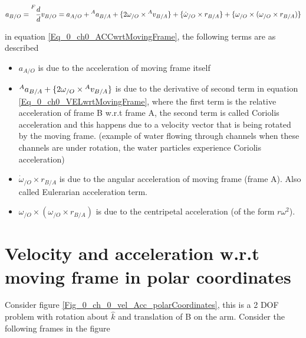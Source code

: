 \begin{equation} \label{Eq_0_ch0_ACCwrtMovingFrame}
	a_{B/O} = \prescript{F}{}{\frac{d}{d}v_{B/O}} = a_{A/O} + \prescript{A}{}{a_{B/A}} + \{ 2 \omega_{/O} \times \prescript{A}{}{v_{B/A}} \} + \{ \dot{\omega}_{/O} \times r_{B/A} \} + \{ \omega_{/O} \times (\omega_{/O} \times r_{B/A}) \}
\end{equation}

in equation \eqref{Eq_0_ch0_ACCwrtMovingFrame}, the following terms are as described
\begin{itemize}
	\item $a_{A/O}$ is due to the acceleration of moving frame itself
	\item $\prescript{A}{}{a_{B/A}} + \{ 2 \omega_{/O} \times \prescript{A}{}{v_{B/A}} \}$ is due to the derivative of second term in equation \eqref{Eq_0_ch0_VELwrtMovingFrame}, where the first term is the relative acceleration of frame B w.r.t frame A, the second term is called Coriolis acceleration and this happens due to a velocity vector that is being rotated by the moving frame. (example of water flowing through channels when these channels are under rotation, the water particles experience Coriolis acceleration)
	\item $ \dot{\omega}_{/O} \times r_{B/A}$ is due to the angular acceleration of moving frame (frame A). Also called Eulerarian acceleration term.
	\item  $\omega_{/O} \times (\omega_{/O} \times r_{B/A})$ is due to the centripetal acceleration (of the form $r \omega^{2}$).
\end{itemize}

\section{Velocity and acceleration w.r.t moving frame in polar coordinates}

Consider figure \ref{Fig_0_ch_0_vel_Acc_polarCoordinates}, this is a 2 DOF problem with rotation about $\hat{k}$ and translation of B on the arm. Consider the following frames in the figure


